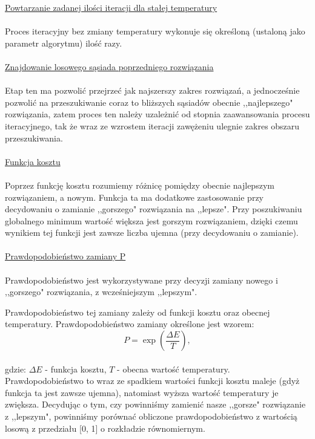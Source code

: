 \documentclass[twoside]{projektInzynierskiMS1}
\newcommand{\newLine}{~\\}
\newcommand{\si}{ś}
\begin{document}
\noindent \underline{Powtarzanie zadanej ilo\si ci iteracji dla stałej temperatury} \\ \newLine
Proces iteracyjny bez zmiany temperatury wykonuje się okre\si loną (ustaloną jako parametr algorytmu) ilo\si ć razy. \\ \newLine

\noindent \underline{Znajdowanie losowego sąsiada poprzedniego rozwiązania} \\ \newLine
\indent Etap ten ma pozwolić przejrzeć jak najszerszy zakres rozwiązań, a jednocze\si nie pozwolić na przeszukiwanie coraz to bliższych sąsiadów obecnie ,,najlepszego" rozwiązania, zatem proces ten należy uzależnić od stopnia zaawansowania procesu iteracyjnego, tak że wraz ze wzrostem iteracji zawężeniu ulegnie zakres obszaru przeszukiwania.\\ \newLine

\noindent \underline{Funkcja kosztu} \\ \newLine
\indent Poprzez funkcję kosztu rozumiemy różnicę pomiędzy obecnie najlepszym rozwiązaniem, a nowym. Funkcja ta ma dodatkowe zastosowanie przy decydowaniu o zamianie ,,gorszego" rozwiązania na ,,lepsze". Przy poszukiwaniu globalnego minimum warto\si ć większa jest gorszym rozwiązaniem, dzięki czemu wynikiem tej funkcji jest zawsze liczba ujemna (przy decydowaniu o zamianie). \\ \newLine


\noindent \underline{Prawdopodobieństwo zamiany P} \\ \newLine
\indent Prawdopodobieństwo jest wykorzystywane przy decyzji zamiany nowego i ,,gorszego" rozwiązania, z wcze\si niejszym ,,lepszym". 

Prawdopodobieństwo tej zamiany zależy od funkcji kosztu oraz obecnej temperatury. Prawdopodobieństwo zamiany okre\si lone jest wzorem:
$$ P = \exp\left(\frac{\Delta E}{T}\right),  $$ \\

gdzie: $ \Delta E$  - funkcja kosztu, $T$ - obecna warto\si ć temperatury.\\

Prawdopodobieństwo to wraz ze spadkiem warto\si ci funkcji kosztu maleje (gdyż funkcja ta jest zawsze ujemna), natomiast wyższa warto\si ć temperatury je zwiększa. Decydując o tym, czy powinniśmy zamienić nasze ,,gorsze" rozwiązanie z ,,lepszym", powinniśmy porównać obliczone prawdopodobieństwo z wartością losową z przedziału [0, 1] o rozkładzie równomiernym.\\ \newLine
\end{document}

